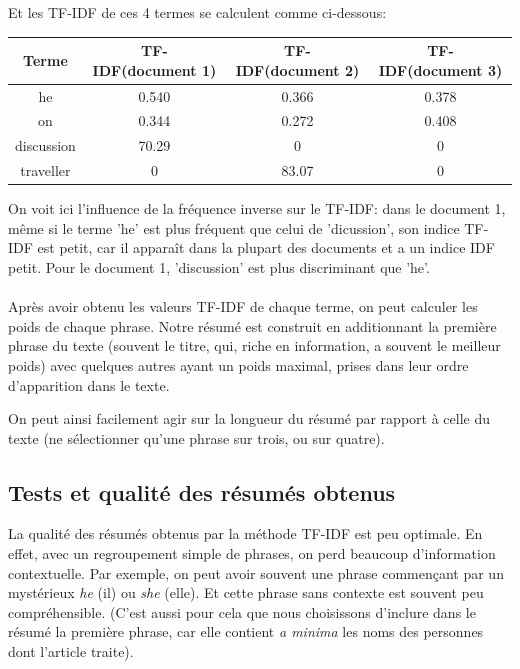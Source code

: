 \documentclass[a4paper, 12pt]{article}
\begin{document}
Et les TF-IDF de ces 4 termes se calculent comme ci-dessous:

\begin{center}
	\begin{tabular}{|c|c|c|c|}
	 \hline
	 	Terme & TF-IDF(document 1) & TF-IDF(document 2) & TF-IDF(document 3) \\
	 \hline
	 	he & 0.540 & 0.366 & 0.378 \\
	 \hline
	 	on & 0.344 & 0.272 & 0.408 \\
	 \hline
	 	discussion & 70.29 & 0 & 0 \\
	 \hline
	 	traveller & 0 & 83.07 & 0 \\
	 \hline
	\end{tabular}
\end{center}

On voit ici l'influence de la fréquence inverse sur le TF-IDF: dans le document 1, même si le terme 'he' est plus fréquent que celui de 'dicussion', son indice TF-IDF est petit, car il apparaît dans la plupart des documents et a un indice IDF petit. Pour le document 1, 'discussion' est plus discriminant que 'he'.

\paragraph{}
Après avoir obtenu les valeurs TF-IDF de chaque terme, on peut calculer les poids de chaque phrase. Notre résumé est construit en additionnant la première phrase du texte (souvent le titre, qui, riche en information, a souvent le meilleur poids) avec quelques autres ayant un poids maximal, prises dans leur ordre d'apparition dans le texte.

On peut ainsi facilement agir sur la longueur du résumé par rapport à celle du texte (ne sélectionner qu'une phrase sur trois, ou sur quatre).

\subsection{Tests et qualité des résumés obtenus}

La qualité des résumés obtenus par la méthode TF-IDF est peu optimale. En effet, avec un regroupement simple de phrases, on perd beaucoup d'information contextuelle. Par exemple, on peut avoir souvent une phrase commençant par un mystérieux \textit{he} (il) ou \textit{she} (elle). Et cette phrase sans contexte est souvent peu compréhensible. (C'est aussi pour cela que nous choisissons d'inclure dans le résumé la première phrase, car elle contient \textit{a minima} les noms des personnes dont l'article traite).
\end{document}

